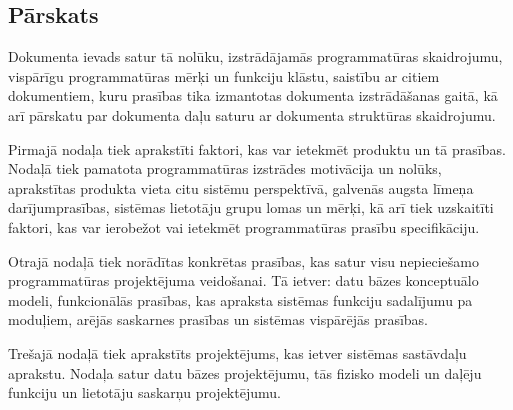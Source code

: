 \subsection*{Pārskats}

Dokumenta ievads satur tā nolūku, izstrādājamās programmatūras skaidrojumu,
vispārīgu programmatūras mērķi un funkciju klāstu, saistību ar citiem
dokumentiem, kuru prasības tika izmantotas dokumenta izstrādāšanas gaitā, kā
arī pārskatu par dokumenta daļu saturu ar dokumenta struktūras skaidrojumu.

Pirmajā nodaļa tiek aprakstīti faktori, kas var ietekmēt produktu un tā
prasības. Nodaļā tiek pamatota programmatūras izstrādes motivācija un nolūks,
aprakstītas produkta vieta citu sistēmu perspektīvā, galvenās augsta līmeņa
darījumprasības, sistēmas lietotāju grupu lomas un mērķi, kā arī tiek
uzskaitīti faktori, kas var ierobežot vai ietekmēt programmatūras prasību
specifikāciju.

Otrajā nodaļā tiek norādītas konkrētas prasības, kas satur visu nepieciešamo
programmatūras projektējuma veidošanai. Tā ietver: datu bāzes konceptuālo
modeli, funkcionālās prasības, kas apraksta sistēmas funkciju sadalījumu pa
moduļiem, arējās saskarnes prasības un sistēmas vispārējās prasības.

Trešajā nodaļā tiek aprakstīts projektējums, kas ietver sistēmas sastāvdaļu
aprakstu. Nodaļa satur datu bāzes projektējumu, tās fizisko modeli un daļēju
funkciju un lietotāju saskarņu projektējumu.
